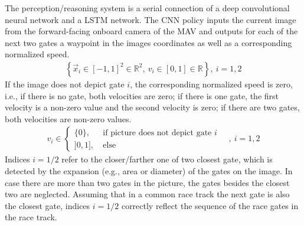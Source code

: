The perception/reasoning system is a serial connection of a deep convolutional neural network and a LSTM network.
The CNN policy inputs the current image from the forward-facing onboard camera of the MAV
and outputs for each of the next two gates a waypoint in the images coordinates as well as a corresponding normalized speed.
\begin{align}
    \left\{ \vec x_i \in [ -1,1 ]^2 \in \mathbb{R}^2 ,\ v_i \in [0,1] \in \mathbb{R} \right\} ,\ i=1,2
\end{align}
If the image does not depict gate $i$, the corresponding normalized speed is zero, i.e.,
if there is no gate, both velocities are zero;
if there is one gate, the first velocity is a non-zero value and the second velocity is zero;
if there are two gates, both velocities are non-zero values.
\begin{align}
    v_i \in
    \begin{cases}
        \{0\},\ &\text{if picture does not depict gate }i \\
        ]0,1],\ &\text{else} 
    \end{cases}
    \quad,\ i=1,2
\end{align}
Indices $i=1/2$ refer to the closer/farther one of two closest gate, 
which is detected by the expansion (e.g., area or diameter) of the gates on the image.
In case there are more than two gates in the picture, the gates besides the closest two are neglected.
Assuming that in a common race track the next gate is also the closest gate,
indices $i=1/2$ correctly reflect the sequence of the race gates in the race track.


